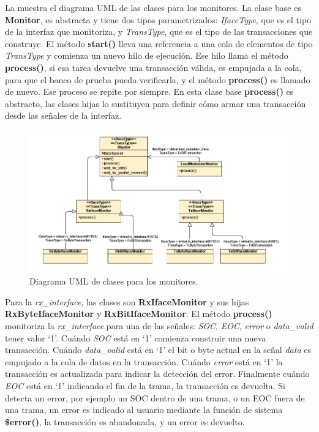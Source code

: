 \documentclass[a4paper, twoside, 11pt]{report}
\begin{document}
La  muestra el diagrama UML de las clases para los monitores. La clase base es \textbf{Monitor}, es abstracta y tiene dos tipos parametrizados: \textit{IfaceType}, que es el tipo de la interfaz que monitoriza, y \textit{TransType}, que es el tipo de las transacciones que construye. El método \textbf{start()} lleva una referencia a una cola de elementos de tipo \textit{TransType} y comienza un nuevo hilo de ejecución. Ese hilo llama el método \textbf{process()}, si esa tarea devuelve una transacción válida, es empujada a la cola, para que el banco de prueba pueda verificarla, y el método \textbf{process()} es llamado de nuevo. Ese proceso se repite por siempre. En esta clase base \textbf{process()} es abstracto, las clases hijas lo sustituyen para definir cómo armar una transacción desde las señales de la interfaz.

\begin{figure}[htb]
  \centering
  \includegraphics[width=1.0\textwidth]{./img/monitors_uml.vpd}
  \caption{Diagrama UML de clases para los monitores.}
  \label{fig:monitor_uml}
\end{figure}

Para la \textit{rx\_interface}, las clases son \textbf{RxIfaceMonitor} y sus hijas \textbf{RxByteIfaceMonitor} y \textbf{RxBitIfaceMonitor}. El método \textbf{process()} monitoriza la \textit{rx\_interface} para una de las señales: \textit{SOC}, \textit{EOC}, \textit{error} o \textit{data\_valid} tener valor ‘1’. Cuándo \textit{SOC} está en ‘1’ comienza construir una nueva transacción. Cuándo \textit{data\_valid} está en ‘1’ el bit o byte actual en la señal \textit{data} es empujado a la cola de datos en la transacción. Cuándo \textit{error} está en ‘1’ la transacción es actualizada para indicar la detección del error. Finalmente cuándo \textit{EOC} está en ‘1’ indicando el fin de la trama, la transacción es devuelta. Si detecta un error, por ejemplo un SOC dentro de una trama, o un EOC fuera de una trama, un error es indicado al usuario mediante la función de sistema \textbf{\$error()}, la transacción es abandonada, y un error es devuelto.
\end{document}

